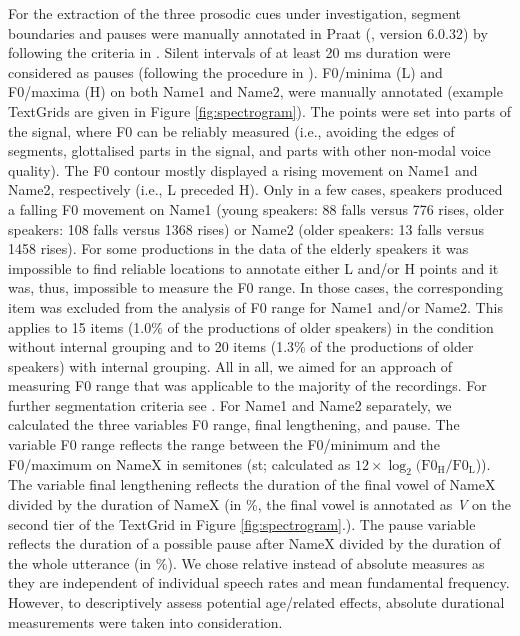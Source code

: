 \documentclass[output=paper]{langscibook}
\begin{document}
For the extraction of the three prosodic cues under investigation, segment boundaries and pauses were manually annotated in Praat (\citealt{boersma_praat:_2017}, version 6.0.32) by following the criteria in \citet{turk_acoustic_2006}. Silent intervals of at least 20 ms duration were considered as pauses (following the procedure in \citealt{petrone_prosodic_2017}). F0\-/minima (L) and F0\-/maxima (H) on both Name1 and Name2, were manually annotated (example TextGrids are given in Figure \ref{fig:spectrogram}). The points were set into parts of the signal, where F0 can be reliably measured (i.e., avoiding the edges of segments, glottalised parts in the signal, and parts with other non-modal voice quality). The F0 contour mostly displayed a rising movement on Name1 and Name2, respectively (i.e., L preceded H). Only in a few cases, speakers produced a falling F0 movement on Name1 (young speakers: 88 falls versus 776 rises, older speakers: 108 falls versus 1368 rises) or Name2 (older speakers: 13 falls versus 1458 rises). For some productions in the data of the elderly speakers it was impossible to find reliable locations to annotate either L and/or H points and it was, thus, impossible to measure the F0 range. In those cases, the corresponding item was excluded from the analysis of F0 range for Name1 and/or Name2. This applies to 15 items (1.0\% of the productions of older speakers) in the condition without internal grouping and to 20 items (1.3\% of the productions of older speakers) with internal grouping. All in all, we aimed for an approach of measuring F0 range that was applicable to the majority of the recordings. For further segmentation criteria see \citet{huttenlauchetal2021}. For Name1 and Name2 separately, we calculated the three variables F0 range, final lengthening, and pause. The variable F0 range reflects the range between the F0\-/minimum and the F0\-/maximum on NameX in semitones (st; calculated as $12\times\log_2(\text{F0}_{\text{H}}/\text{F0}_{\text{L}}$)). The variable final lengthening reflects the duration of the final vowel of NameX divided by the duration of NameX (in \%, the final vowel is annotated as \textit{V} on the second tier of the TextGrid in Figure \ref{fig:spectrogram}.). The pause variable reflects the duration of a possible pause after NameX divided by the duration of the whole utterance (in \%). We chose relative instead of absolute measures as they are independent of individual speech rates and mean fundamental frequency. However, to descriptively assess potential age\-/related effects, absolute durational measurements were taken into consideration. 
\end{document}

